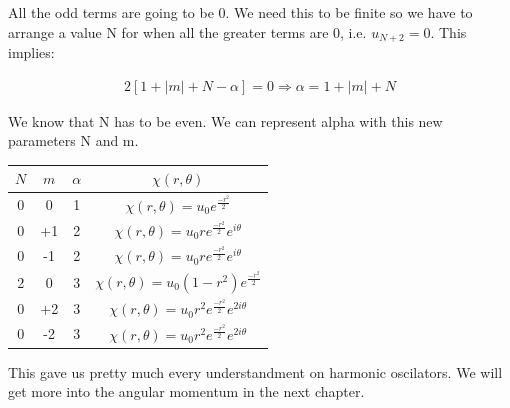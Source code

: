 All the odd terms are going to be 0. We need this to be finite so we have to arrange a value N for when all the greater terms are 0, i.e. $u_{N+2} = 0$. This implies:

\begin{equation}
  \begin{array}{c}
    2[1+|m|+N-\alpha] = 0 \Rightarrow \alpha= 1+|m|+N
  \end{array}
\end{equation}

We know that N has to be even. We can represent alpha with this new parameters N and m.

\begin{tabular}{| c | c | c | c |}
  \hline
  $N$ & $m$ & $\alpha$ & $\chi(r,\theta)$ \\
  \hline
  0 & 0 & 1  & $\chi(r,\theta) = u_0 e^{\frac{-r^2}{2}}$              \\
  \hline
  0 & +1 & 2 & $\chi(r,\theta) = u_0re^{\frac{-r^2}{2}}e^{i\theta}$   \\
  \hline
  0 & -1 & 2 & $\chi(r,\theta) = u_0 re^{\frac{-r^2}{2}}e^{i\theta}$  \\
  \hline
  2 & 0 & 3  & $\chi(r, \theta) = u_0(1-r^2)e^{\frac{-r^2}{2}}$ \\
  \hline
  0 & +2 & 3 & $\chi(r, \theta) = u_0r^2e^{\frac{-r^2}{2}}e^{2i\theta}$ \\
  \hline
  0 & -2 & 3 & $\chi(r, \theta) = u_0r^2e^{\frac{-r^2}{2}}e^{2i\theta}$ \\
  \hline
\end{tabular}

This gave us pretty much every understandment on harmonic oscilators. We will get more into the angular momentum in the next chapter.






